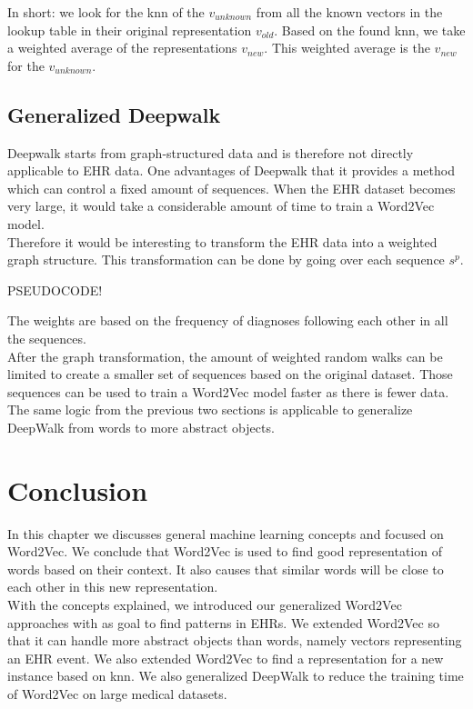 In short: we look for the knn of the $v_{unknown}$ from all the known vectors in the lookup table in their original representation $v_{old}$. Based on the found knn, we take a weighted average of the representations $v_{new}$. This weighted average is the $v_{new}$ for the $v_{unknown}$.

\subsection{Generalized Deepwalk}

Deepwalk starts from graph-structured data and is therefore not directly applicable to EHR data. One advantages of Deepwalk that it provides a method which can control a fixed amount of sequences. When the EHR dataset becomes very large, it would take a considerable amount of time to train a Word2Vec model. \\

Therefore it would be interesting to transform the EHR data into a weighted graph structure. This transformation can be done by going over each sequence $s^p$. 

PSEUDOCODE! 

 The weights are based on the frequency of diagnoses following each other in all the sequences. \\
After the graph transformation, the amount of weighted random walks can be limited to create a smaller set of sequences based on the original dataset. Those sequences can be used to train a Word2Vec model faster as there is fewer data. The same logic from the previous two sections is applicable to generalize DeepWalk from words to more abstract objects.


\section{Conclusion}
In this chapter we discusses general machine learning concepts and focused on Word2Vec. We conclude that Word2Vec is used to find good representation of words based on their context. It also causes that similar words will be close to each other in this new representation. \\

With the concepts explained, we introduced our generalized Word2Vec approaches with as goal to find patterns in EHRs. We extended Word2Vec so that it can handle more abstract objects than words, namely vectors representing an EHR event. We also extended Word2Vec to find a representation for a new instance based on knn. We also generalized DeepWalk to reduce the training time of Word2Vec on large medical datasets.



